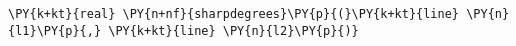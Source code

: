 \begin{Verbatim}[commandchars=\\\{\}]
    \PY{k+kt}{real} \PY{n+nf}{sharpdegrees}\PY{p}{(}\PY{k+kt}{line} \PY{n}{l1}\PY{p}{,} \PY{k+kt}{line} \PY{n}{l2}\PY{p}{)}
\end{Verbatim}
